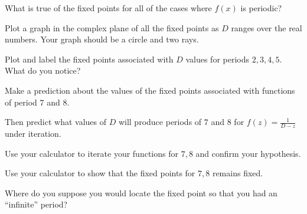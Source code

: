 \documentclass[../key.tex]{subfiles}
\begin{document}
\begin{inner_problem}
\item What is true of the fixed points for all of the cases where $f(x)$ is periodic?
\end{inner_problem}

\begin{outer_problem}
\item
\end{outer_problem}

\begin{inner_problem}[start=1]
\item Plot a graph in the complex plane of all the fixed points as $D$ ranges over the real numbers. Your graph should be a circle and two rays.
\end{inner_problem}

\begin{inner_problem}
\item Plot and label the fixed points associated with $D$ values for periods $2,3,4,5$. What do you notice?
\end{inner_problem}

\begin{inner_problem}
\item Make a prediction about the values of the fixed points associated with functions of period $7$ and $8$.
\end{inner_problem}

\begin{inner_problem}
\item Then predict what values of $D$ will produce periods of $7$ and $8$ for $f(z)=\frac{1}{D-z}$ under iteration.
\end{inner_problem}

\begin{inner_problem}
\item Use your calculator to iterate your functions for $7,8$ and confirm your hypothesis.
\end{inner_problem}

\begin{inner_problem}
\item Use your calculator to show that the fixed points for $7,8$ remains fixed.
\end{inner_problem}

\begin{inner_problem}
\item Where do you suppose you would locate the fixed point so that you had an ``infinite'' period?
\end{inner_problem}
\end{document}

